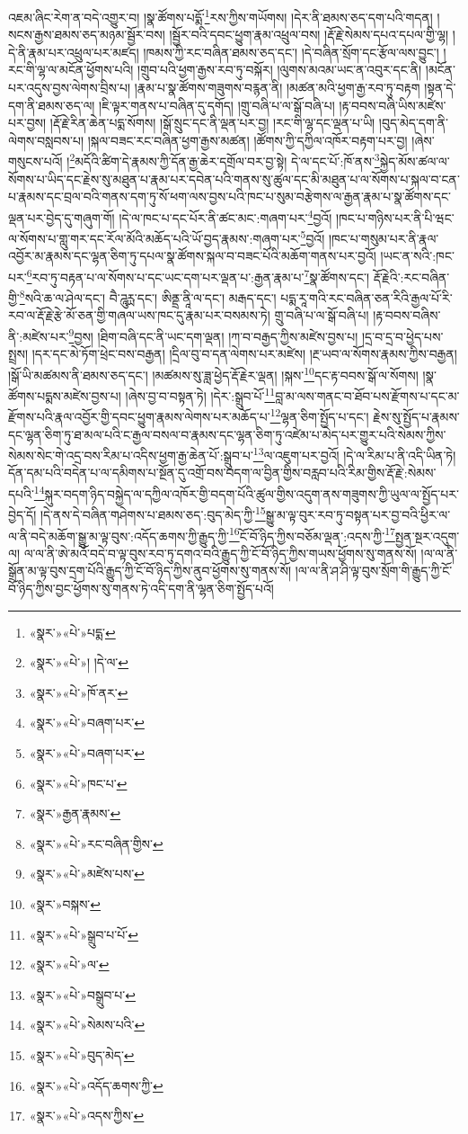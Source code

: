 འཇམ་ཞིང་རེག་ན་བདེ་འགྱུར་བ། །སྣ་ཚོགས་པདྨོ་\footnote{«སྣར་»«པེ་»པདྨ་}རས་ཀྱིས་གཡོགས། །དེར་ནི་ཐམས་ཅད་དག་པའི་གདན། །སངས་རྒྱས་ཐམས་ཅད་མཉམ་སྦྱོར་བས། །སྦྱོར་བའི་དབང་ཕྱུག་རྣམ་འཕྲུལ་བས། །རྡོ་རྗེ་སེམས་དཔའ་དཔལ་གྱི་ལྷ། །དེ་ནི་རྣམ་པར་འཕྲུལ་པར་མཛད། །ཁམས་ཀྱི་རང་བཞིན་ཐམས་ཅད་དང་། །དེ་བཞིན་སྲོག་དང་རྩོལ་ལས་བྱུང་། །རང་གི་ལྷ་ལ་མངོན་ཕྱོགས་པའི། །གྲུབ་པའི་ཕྱག་རྒྱས་རབ་ཏུ་བསྐོར། །ལུགས་མའམ་ཡང་ན་འབུར་དང་ནི། །མངོན་པར་འདུས་བྱས་ལེགས་བྲིས་པ། །རྣམ་པ་སྣ་ཚོགས་གཟུགས་བརྙན་ནི། །མཚན་མའི་ཕྱག་རྒྱ་རབ་ཏུ་བརྟག །སྟན་དེ་དག་ནི་ཐམས་ཅད་ལ། །ཇི་ལྟར་གནས་པ་བཞིན་དུ་དགོད། །གྲུ་བཞི་པ་ལ་སྒོ་བཞི་པ། །རྟ་བབས་བཞི་ཡིས་མཛེས་པར་བྱས། །རྡོ་རྗེ་རིན་ཆེན་པདྨ་སོགས། །སྒོ་སྲུང་དང་ནི་ལྡན་པར་བྱ། །རང་གི་ལྷ་དང་ལྡན་པ་ཡི། །བུད་མེད་དག་ནི་ལེགས་བསླབས་པ། །སྐལ་བཟང་རང་བཞིན་ཕྱག་རྒྱས་མཚན། །ཚོགས་ཀྱི་དཀྱིལ་འཁོར་བརྟག་པར་བྱ། །ཞེས་གསུངས་པའོ། །\footnote{«སྣར་»«པེ་»། །དེ་ལ་}མདོའི་ཚིག་དེ་རྣམས་ཀྱི་དོན་རྒྱ་ཆེར་དགྲོལ་བར་བྱ་སྟེ། དེ་ལ་དང་པོ་:ཁོ་ནས་\footnote{«སྣར་»«པེ་»ཁོ་ནར་}སྐྱེད་མོས་ཚལ་ལ་སོགས་པ་ཡིད་དང་རྗེས་སུ་མཐུན་པ་རྣམ་པར་དབེན་པའི་གནས་སུ་ཚུལ་དང་མི་མཐུན་པ་ལ་སོགས་པ་སྐལ་བ་ངན་པ་རྣམས་དང་བྲལ་བའི་གནས་དག་ཏུ་སོ་ཕག་ལས་བྱས་པའི་ཁང་པ་སུམ་བརྩེགས་ལ་རྒྱན་རྣམ་པ་སྣ་ཚོགས་དང་ལྡན་པར་བྱེད་དུ་གཞུག་གོ། །དེ་ལ་ཁང་པ་དང་པོར་ནི་ཚང་མང་:གཞག་པར་\footnote{«སྣར་»«པེ་»བཞག་པར་}བྱའོ། །ཁང་པ་གཉིས་པར་ནི་པི་ཝང་ལ་སོགས་པ་གླུ་གར་དང་རོལ་མོའི་མཆོད་པའི་ཡོ་བྱད་རྣམས་:གཞག་པར་\footnote{«སྣར་»«པེ་»བཞག་པར་}བྱའོ། །ཁང་པ་གསུམ་པར་ནི་རྣལ་འབྱོར་མ་རྣམས་དང་ལྷན་ཅིག་ཏུ་དཔལ་སྣ་ཚོགས་སྐལ་བ་བཟང་པོའི་མཆོག་གནས་པར་བྱའོ། །ཡང་ན་སའི་:ཁང་པར་\footnote{«སྣར་»«པེ་»ཁང་པ་}རབ་ཏུ་བརྟན་པ་ལ་སོགས་པ་དང་ཡང་དག་པར་ལྡན་པ་:རྒྱན་རྣམ་པ་\footnote{«སྣར་»རྒྱན་རྣམས་}སྣ་ཚོགས་དང་། རྡོ་རྗེའི་:རང་བཞིན་གྱི་\footnote{«སྣར་»«པེ་»རང་བཞིན་གྱིས་}སའི་ཆ་ལ་ཤེལ་དང་། བཻ་ཌཱུཪྻ་དང་། ཨིནྡྲ་ནཱི་ལ་དང་། མརྒད་དང་། པདྨ་རཱ་གའི་རང་བཞིན་ཅན་རིའི་རྒྱལ་པོ་རི་རབ་ལ་རྡོ་རྗེ་རྩེ་མོ་ཅན་གྱི་གཞལ་ཡས་ཁང་དུ་རྣམ་པར་བསམས་ཏེ། གྲུ་བཞི་པ་ལ་སྒོ་བཞི་པ། །རྟ་བབས་བཞིས་ནི་:མཛེས་པར་\footnote{«སྣར་»«པེ་»མཛེས་པས་}བྱས། །ཐིག་བཞི་དང་ནི་ཡང་དག་ལྡན། །ཀ་བ་བརྒྱད་ཀྱིས་མཛེས་བྱས་པ། །དྲ་བ་དྲ་བ་ཕྱེད་པས་སྤྲས། །དར་དང་མེ་ཏོག་ཕྲེང་བས་བརྒྱན། །དྲིལ་བུ་བ་དན་ལེགས་པར་མཛེས། །རྔ་ཡབ་ལ་སོགས་རྣམས་ཀྱིས་བརྒྱན། །སྒོ་ཡི་མཚམས་ནི་ཐམས་ཅད་དང་། །མཚམས་སུ་ཟླ་ཕྱེད་རྡོ་རྗེར་ལྡན། །སྐས་\footnote{«སྣར་»བསྐས་}དང་རྟ་བབས་སྒོ་ལ་སོགས། །སྣ་ཚོགས་པདྨས་མཛེས་བྱས་པ། །ཞེས་བྱ་བ་བསྟན་ཏེ། །དེར་:སྒྲུབ་པོ་\footnote{«སྣར་»«པེ་»སྒྲུབ་པ་པོ་}བླ་མ་ལས་གནང་བ་ཐོབ་པས་རྫོགས་པ་དང་མ་རྫོགས་པའི་རྣལ་འབྱོར་གྱི་དབང་ཕྱུག་རྣམས་ལེགས་པར་མཆོད་པ་\footnote{«སྣར་»«པེ་»ལ་}ལྷན་ཅིག་སྤྱོད་པ་དང་། རྗེས་སུ་སྤྱོད་པ་རྣམས་དང་ལྷན་ཅིག་ཏུ་ཐ་མལ་པའི་ང་རྒྱལ་བསལ་བ་རྣམས་དང་ལྷན་ཅིག་ཏུ་འཛེམ་པ་མེད་པར་གྱུར་པའི་སེམས་ཀྱིས་སེམས་སེང་གེ་འདྲ་བས་རིམ་པ་འདིས་ཕྱག་རྒྱ་ཆེན་པོ་:སྒྲུབ་པ་\footnote{«སྣར་»«པེ་»བསྒྲུབ་པ་}ལ་འཇུག་པར་བྱའོ། །དེ་ལ་རིམ་པ་ནི་འདི་ཡིན་ཏེ། དོན་དམ་པའི་བདེན་པ་ལ་དམིགས་པ་སྔོན་དུ་འགྲོ་བས་བདག་ལ་བྱིན་གྱིས་བརླབ་པའི་རིམ་གྱིས་རྡོ་རྗེ་:སེམས་དཔའི་\footnote{«སྣར་»«པེ་»སེམས་པའི་}སྐུར་བདག་ཉིད་བསྐྱེད་ལ་དཀྱིལ་འཁོར་གྱི་བདག་པོའི་ཚུལ་གྱིས་འདུག་ནས་གཟུགས་ཀྱི་ཡུལ་ལ་སྤྱོད་པར་བྱེད་དོ། །དེ་ནས་དེ་བཞིན་གཤེགས་པ་ཐམས་ཅད་:བུད་མེད་ཀྱི་\footnote{«སྣར་»«པེ་»བུད་མེད་}སྒྱུ་མ་ལྟ་བུར་རབ་ཏུ་བསྟན་པར་བྱ་བའི་ཕྱིར་ལ་ལ་ནི་བདེ་མཆོག་སྒྱུ་མ་ལྟ་བུས་:འདོད་ཆགས་ཀྱི་རྒྱུད་ཀྱི་\footnote{«སྣར་»«པེ་»འདོད་ཆགས་ཀྱི་}ངོ་བོ་ཉིད་ཀྱིས་བཅོམ་ལྡན་:འདས་ཀྱི་\footnote{«སྣར་»«པེ་»འདས་ཀྱིས་}སྤྱན་སྔར་འདུག་ལ། ལ་ལ་ནི་ཨེ་མའོ་བདེ་བ་ལྟ་བུས་རབ་ཏུ་དགའ་བའི་རྒྱུད་ཀྱི་ངོ་བོ་ཉིད་ཀྱིས་གཡས་ཕྱོགས་སུ་གནས་སོ། །ལ་ལ་ནི་སྒྲོན་མ་ལྟ་བུས་དྲག་པོའི་རྒྱུད་ཀྱི་ངོ་བོ་ཉིད་ཀྱིས་ནུབ་ཕྱོགས་སུ་གནས་སོ། །ལ་ལ་ནི་ཤ་ཤི་ལྟ་བུས་སྲོག་གི་རྒྱུད་ཀྱི་ངོ་བོ་ཉིད་ཀྱིས་བྱང་ཕྱོགས་སུ་གནས་ཏེ་འདི་དག་ནི་ལྷན་ཅིག་སྤྱོད་པའོ། 